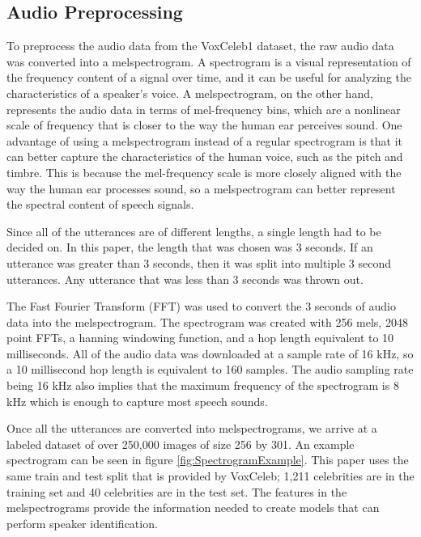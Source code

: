 \documentclass{article}
\begin{document}
\subsection{Audio Preprocessing}
To preprocess the audio data from the VoxCeleb1 dataset, the raw audio data was converted into a melspectrogram. A 
spectrogram is a visual representation of the frequency content of a signal over time, and it can be useful for 
analyzing the characteristics of a speaker's voice. A melspectrogram, on the other hand, represents the audio data in 
terms of mel-frequency bins, which are a nonlinear scale of frequency that is closer to the way the human ear perceives 
sound. One advantage of using a melspectrogram instead of a regular spectrogram is that it can better capture the 
characteristics of the human voice, such as the pitch and timbre. This is because the mel-frequency scale is more closely 
aligned with the way the human ear processes sound, so a melspectrogram can better represent the spectral content of speech signals.

Since all of the utterances are of different lengths, a single length had to be decided on. In this paper, the 
length that was chosen was 3 seconds. If an utterance was greater than 3 seconds, then it was split into multiple 3 
second utterances. Any utterance that was less than 3 seconds was thrown out.

The Fast Fourier Transform (FFT) was used to convert the 3 seconds of audio data into the melspectrogram. The spectrogram
was created with 256 mels, 2048 point FFTs, a hanning windowing function, and a hop length equivalent to 10 milliseconds. 
All of the audio data was downloaded at a sample rate of 16 kHz, so a 10 millisecond hop length is equivalent to 160 
samples. The audio sampling rate being 16 kHz also implies that the maximum frequency of the spectrogram is 8 kHz which 
is enough to capture most speech sounds.

Once all the utterances are converted into melspectrograms, we arrive at a labeled dataset of over 250,000 images of 
size 256 by 301. An example spectrogram can be seen in figure \ref{fig:SpectrogramExample}. This paper uses the same 
train and test split that is provided by VoxCeleb; 1,211 celebrities are in the training set and 40 celebrities are in 
the test set. The features in the melspectrograms provide the information needed to create models that can perform 
speaker identification.

\end{document}
